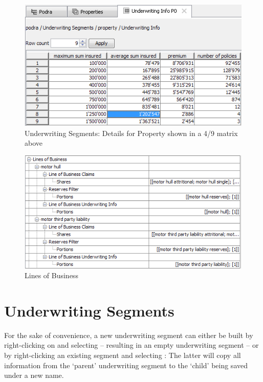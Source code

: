 \begin{figure}[htb]
	\centering
		\includegraphics[scale=0.6]{images/UnderwritingSegmentsProperty.png}
	\caption{Underwriting Segments: Details for Property shown in a 4/9 matrix above}
	\label{fig:UnderwritingSegmentsProperty}
\end{figure}


\begin{figure}[htb]
	\centering
		\includegraphics[scale=0.6]{images/LOB.png}
	\caption{Lines of Business}
	\label{fig:LOB}
\end{figure}

\section{Underwriting Segments}
\label{sec:underwritingsegments}
For the sake of convenience, a new underwriting segment can either be built by right-clicking on  and selecting  -- resulting in an empty underwriting segment -- or by right-clicking an existing segment and selecting : The latter will copy all information from the `parent' underwriting segment to the `child' being saved under a new name.

